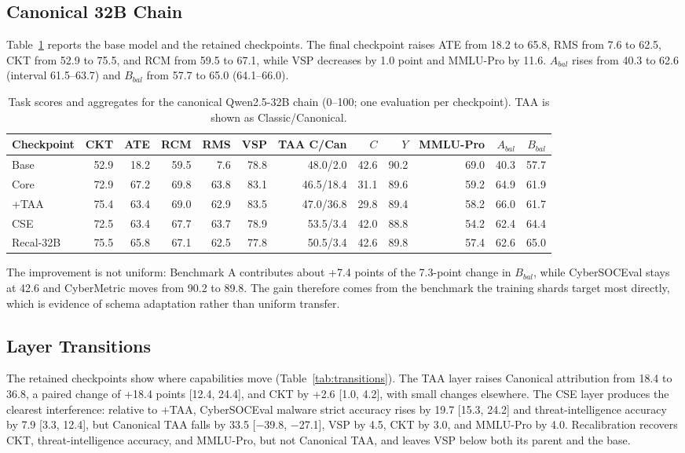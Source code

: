 \documentclass[conference]{IEEEtran}
\begin{document}
\subsection{Canonical 32B Chain}
Table~\ref{tab:mainresults} reports the base model and the retained checkpoints. The final checkpoint raises ATE from 18.2 to 65.8, RMS from 7.6 to 62.5, CKT from 52.9 to 75.5, and RCM from 59.5 to 67.1, while VSP decreases by 1.0 point and MMLU-Pro by 11.6. $A_{bal}$ rises from 40.3 to 62.6 (interval 61.5--63.7) and $B_{bal}$ from 57.7 to 65.0 (64.1--66.0).

\begin{table}[t]
\caption{Task scores and aggregates for the canonical Qwen2.5-32B chain (0--100; one evaluation per checkpoint). TAA is shown as Classic/Canonical.}
\label{tab:mainresults}
\centering
\scriptsize
\setlength{\tabcolsep}{3.0pt}
\begin{tabular}{@{}lrrrrrrrrrrr@{}}
\toprule
Checkpoint & CKT & ATE & RCM & RMS & VSP & TAA C/Can & $C$ & $Y$ & MMLU-Pro & $A_{bal}$ & $B_{bal}$ \\
\midrule
Base & 52.9 & 18.2 & 59.5 & 7.6 & 78.8 & 48.0/2.0 & 42.6 & 90.2 & 69.0 & 40.3 & 57.7 \\
Core & 72.9 & 67.2 & 69.8 & 63.8 & 83.1 & 46.5/18.4 & 31.1 & 89.6 & 59.2 & 64.9 & 61.9 \\
+TAA & 75.4 & 63.4 & 69.0 & 62.9 & 83.5 & 47.0/36.8 & 29.8 & 89.4 & 58.2 & 66.0 & 61.7 \\
CSE & 72.5 & 63.4 & 67.7 & 63.7 & 78.9 & 53.5/3.4 & 42.0 & 88.8 & 54.2 & 62.4 & 64.4 \\
Recal-32B & 75.5 & 65.8 & 67.1 & 62.5 & 77.8 & 50.5/3.4 & 42.6 & 89.8 & 57.4 & 62.6 & 65.0 \\
\bottomrule
\end{tabular}
\end{table}

The improvement is not uniform: Benchmark A contributes about +7.4 points of the 7.3-point change in $B_{bal}$, while CyberSOCEval stays at 42.6 and CyberMetric moves from 90.2 to 89.8. The gain therefore comes from the benchmark the training shards target most directly, which is evidence of schema adaptation rather than uniform transfer.

\subsection{Layer Transitions}
The retained checkpoints show where capabilities move (Table~\ref{tab:transitions}). The TAA layer raises Canonical attribution from 18.4 to 36.8, a paired change of +18.4 points [12.4, 24.4], and CKT by +2.6 [1.0, 4.2], with small changes elsewhere. The CSE layer produces the clearest interference: relative to +TAA, CyberSOCEval malware strict accuracy rises by 19.7 [15.3, 24.2] and threat-intelligence accuracy by 7.9 [3.3, 12.4], but Canonical TAA falls by 33.5 [$-$39.8, $-$27.1], VSP by 4.5, CKT by 3.0, and MMLU-Pro by 4.0. Recalibration recovers CKT, threat-intelligence accuracy, and MMLU-Pro, but not Canonical TAA, and leaves VSP below both its parent and the base.
\end{document}
